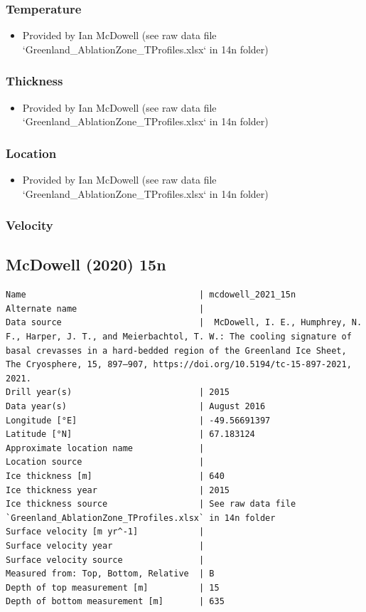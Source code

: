 \documentclass[article,a4paper,times,11pt,twoside]{article}
\begin{document}
\subsubsection{Temperature}
\label{sec:org2db00cd}

\begin{itemize}
\item Provided by Ian McDowell (see raw data file `Greenland\_AblationZone\_TProfiles.xlsx` in 14n folder)
\end{itemize}

\subsubsection{Thickness}
\label{sec:org21d67db}

\begin{itemize}
\item Provided by Ian McDowell (see raw data file `Greenland\_AblationZone\_TProfiles.xlsx` in 14n folder)
\end{itemize}

\subsubsection{Location}
\label{sec:org9556f35}

\begin{itemize}
\item Provided by Ian McDowell (see raw data file `Greenland\_AblationZone\_TProfiles.xlsx` in 14n folder)
\end{itemize}

\subsubsection{Velocity}
\label{sec:orgdedca07}
\clearpage
\subsection{McDowell (2020) 15n}
\label{sec:org9412ee5}
\begin{verbatim}
Name                                  | mcdowell_2021_15n
Alternate name                        | 
Data source                           |  McDowell, I. E., Humphrey, N. F., Harper, J. T., and Meierbachtol, T. W.: The cooling signature of basal crevasses in a hard-bedded region of the Greenland Ice Sheet, The Cryosphere, 15, 897–907, https://doi.org/10.5194/tc-15-897-2021, 2021.
Drill year(s)                         | 2015
Data year(s)                          | August 2016
Longitude [°E]                        | -49.56691397
Latitude [°N]                         | 67.183124
Approximate location name             | 
Location source                       | 
Ice thickness [m]                     | 640
Ice thickness year                    | 2015
Ice thickness source                  | See raw data file `Greenland_AblationZone_TProfiles.xlsx` in 14n folder
Surface velocity [m yr^-1]            | 
Surface velocity year                 | 
Surface velocity source               | 
Measured from: Top, Bottom, Relative  | B
Depth of top measurement [m]          | 15
Depth of bottom measurement [m]       | 635
\end{verbatim}
\end{document}
